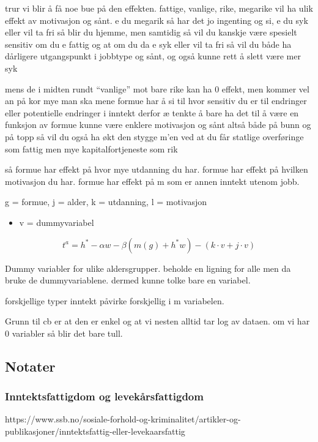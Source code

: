 \documentclass[
  12pt,
  a4paper,
  DIV=11,
  numbers=noendperiod]{scrartcl}
\providecommand{\tightlist}{%
  \setlength{\itemsep}{0pt}\setlength{\parskip}{0pt}}\usepackage{longtable,booktabs,array}
\begin{document}
trur vi blir å få noe bue på den effekten. fattige, vanlige, rike,
megarike vil ha ulik effekt av motivasjon og sånt. e du megarik så har
det jo ingenting og si, e du syk eller vil ta fri så blir du hjemme, men
samtidig så vil du kanskje være spesielt sensitiv om du e fattig og at
om du da e syk eller vil ta fri så vil du både ha dårligere utgangspunkt
i jobbtype og sånt, og også kunne rett å slett være mer syk

mens de i midten rundt ``vanlige'' mot bare rike kan ha 0 effekt, men
kommer vel an på kor mye man ska mene formue har å si til hvor sensitiv
du er til endringer eller potentielle endringer i inntekt derfor æ
tenkte å bare ha det til å være en funksjon av formue kunne være enklere
motivasjon og sånt altså både på bunn og på topp så vil du også ha økt
den stygge m'en ved at du får statlige overføringe som fattig men mye
kapitalfortjeneste som rik

så formue har effekt på hvor mye utdanning du har. formue har effekt på
hvilken motivasjon du har. formue har effekt på m som er annen inntekt
utenom jobb.

g = formue, j = alder, k = utdanning, l = motivasjon

\begin{itemize}
\tightlist
\item
  v = dummyvariabel
\end{itemize}

\[
t^a = h^* - \alpha w - \beta(m(g) + h^*w) - (k\cdot v+j\cdot v)
\]

Dummy variabler for ulike aldersgrupper. beholde en ligning for alle men
da bruke de dummyvariablene. dermed kunne tolke bare en variabel.

forskjellige typer inntekt påvirke forskjellig i m variabelen.

Grunn til cb er at den er enkel og at vi nesten alltid tar log av
dataen. om vi har 0 variabler så blir det bare tull.

\subsection{Notater}\label{notater-1}

\subsubsection{Inntektsfattigdom og
levekårsfattigdom}\label{inntektsfattigdom-og-levekuxe5rsfattigdom}

https://www.ssb.no/sosiale-forhold-og-kriminalitet/artikler-og-publikasjoner/inntektsfattig-eller-levekaarsfattig
\end{document}
